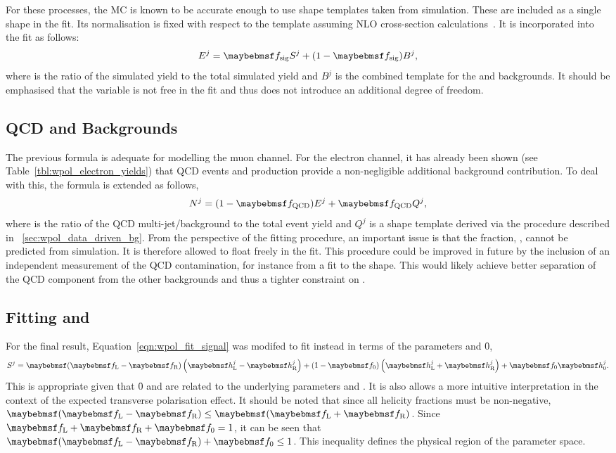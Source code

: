For these processes, the \ac{MC} is known to be accurate enough to use \LP shape
templates taken from simulation. These are included as a single shape in the
fit. Its normalisation is fixed with respect to the \Wjets template assuming
\ac{NLO} cross-section
calculations~\cite{ellis_wp3jet,berger_wp4jet,heavy_quark,top_quark,drellyan}. It
is incorporated into the fit as follows:
\begin{equation*}
E^j = \fsig S^j + (1-\fsig) B^j,
\end{equation*}
where \fsig is the ratio of the simulated \Wjets yield to the total
simulated yield and $B^j$ is the combined \LP template for the \Zjets and \ttbar
backgrounds. It should be emphasised that the variable \fsig is not
free in the fit and thus does not introduce an additional degree of freedom.

\subsection{\acs{QCD} and \gammajets Backgrounds}
The previous formula is adequate for modelling the muon channel. For the
electron channel, it has already been shown (see
Table~\ref{tbl:wpol_electron_yields}) that \ac{QCD} events and \gammajets
production provide a non-negligible additional background contribution. To deal
with this, the formula is extended as follows,
\begin{equation*}
N^j = (1 - \fQCD) E^j + \fQCD Q^j,
\end{equation*}
where \fQCD is the ratio of the QCD multi-jet/\gammajets background to the total
event yield and $Q^j$ is a shape template derived via the procedure described in
\sec~\ref{sec:wpol_data_driven_bg}. From the perspective of the fitting
procedure, an important issue is that the fraction, \fQCD, cannot be predicted
from simulation. It is therefore allowed to float freely in the fit. This
procedure could be improved in future by the inclusion of an independent
measurement of the \ac{QCD} contamination, for instance from a fit to the \MET
shape. This would likely achieve better separation of the \ac{QCD} component
from the other backgrounds and thus a tighter constraint on \fQCD.

\subsection[Fitting \fLmfR and \f0]{Fitting \boldmath{\fLmfR} and }
\label{sec:wpol_fit_fmfr}
For the final result, Equation~\ref{eqn:wpol_fit_signal} was modifed to fit
instead in terms of the parameters \fLmfR and \f0,
\begin{equation*}
S^j = \fLmfR \left (\hLj -\hRj\right) + \left(1-\f0\right)\left(\hLj +\hRj\right) +\f0\hZj.
\end{equation*}
This is appropriate given that \f0 and \fLmfR are related to the underlying
parameters \Azero and \Afour. It is also allows a more intuitive interpretation
in the context of the expected transverse polarisation effect. It should be
noted that since all helicity fractions must be non-negative,
$\fLmfR\leq\fLpfR$. Since $\fL +\fR + \f0 = 1$, it can be seen that $\fLmfR +
\f0 \leq 1$. This inequality defines the physical region of the parameter space.

